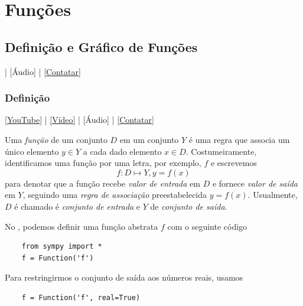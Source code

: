 
\chapter{Funções}\label{cap_funcao}
\thispagestyle{fancy}

\section{Definição e Gráfico de Funções}\label{cap_funcao_sec_defgrafico}

\begin{flushright}
  [Vídeo] | [Áudio] | \href{https://phkonzen.github.io/notas/contato.html}{[Contatar]}
\end{flushright}

\subsection{Definição}

\begin{flushright}
  \href{https://youtu.be/pJbR7bks71M}{[YouTube]} | \href{https://archive.org/details/fundef_202206}{[Vídeo]} | [Áudio] | \href{https://phkonzen.github.io/notas/contato.html}{[Contatar]}
\end{flushright}

Uma \emph{função} de um conjunto $D$ em um conjunto $Y$ é uma regra que associa um único elemento $y\in Y$ a cada dado elemento $x\in D$. Costumeiramente, identificamos uma função por uma letra, por exemplo, $f$ e escrevemos
\begin{equation}
  f:D\mapsto Y, y=f(x)
\end{equation}
para denotar que a função recebe \emph{valor de entrada} em $D$ e fornece \emph{valor de saída} em $Y$, seguindo uma \emph{regra de associação} preestabelecida $y=f(x)$. Usualmente, $D$ é chamado é \emph{conjunto de entrada} e $Y$ de \emph{conjunto de saída}.

\ifispython
\begin{obs}
  No \python, podemos definir uma função abstrata $f$ com o seguinte código
  \begin{lstlisting}
    from sympy import *
    f = Function('f')
  \end{lstlisting}
  Para restringirmos o conjunto de saída aos números reais, usamos
  \begin{lstlisting}
    f = Function('f', real=True)
  \end{lstlisting}  
\end{obs}
\fi

